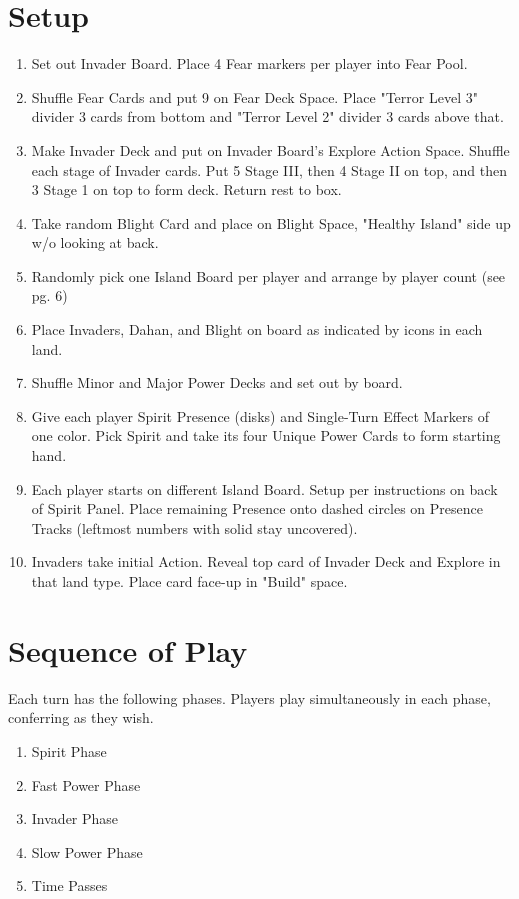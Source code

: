 \documentclass[12pt]{article}
\newenvironment{enumerateCustom}
{\begin{enumerate}
  \setlength{\itemsep}{1pt}
  \setlength{\parskip}{0pt}
  \setlength{\parsep}{0pt}}
{\end{enumerate}}
\begin{document}
\begin{multicols*}{2}

\section*{Setup}
\begin{enumerateCustom}
    \item Set out Invader Board. Place 4 Fear markers per player into Fear Pool.
    \item Shuffle Fear Cards and put 9 on Fear Deck Space. Place "Terror Level 3" divider 3 cards from bottom and "Terror Level 2" divider 3 cards above that.
    \item Make Invader Deck and put on Invader Board's Explore Action Space. Shuffle each stage of Invader cards. Put 5 Stage III, then 4 Stage II on top, and then 3 Stage 1 on top to form deck. Return rest to box.
    \item Take random Blight Card and place on Blight Space, "Healthy Island" side up w/o looking at back.
    \item Randomly pick one Island Board per player and arrange by player count (see pg. 6)
    \item Place Invaders, Dahan, and Blight on board as indicated by icons in each land.
    \item Shuffle Minor and Major Power Decks and set out by board.
    \item Give each player Spirit Presence (disks) and Single-Turn Effect Markers of one color. Pick Spirit and take its four Unique Power Cards to form starting hand.
    \item Each player starts on different Island Board. Setup per instructions on back of Spirit Panel. Place remaining Presence onto dashed circles on Presence Tracks (leftmost numbers with solid stay uncovered).
    \item Invaders take initial Action. Reveal top card of Invader Deck and Explore in that land type. Place card face-up in "Build" space.
\end{enumerateCustom}

\section*{Sequence of Play}
Each turn has the following phases. Players play simultaneously in each phase, conferring as they wish.
\begin{enumerateCustom}
    \item Spirit Phase
    \item Fast Power Phase
    \item Invader Phase
    \item Slow Power Phase
    \item Time Passes
\end{enumerateCustom}


\end{multicols*}
\end{document}
